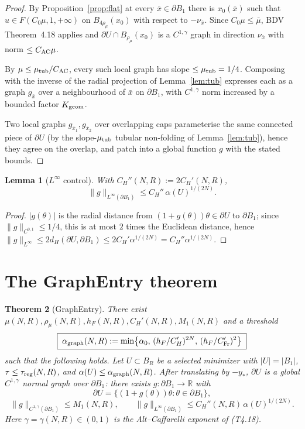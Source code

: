 \documentclass[11pt]{article}
\newtheorem{theorem}{Theorem}[section]
\newtheorem{lemma}[theorem]{Lemma}
\theoremstyle{definition}
\theoremstyle{remark}
\newcommand{\BB}{B_1}
\newcommand{\dH}{d_H}
\newcommand{\R}{\mathbb{R}}
\begin{document}
\begin{proof}
By Proposition~\ref{prop:flat} at every $\bar x\in\partial\BB$ there is
$x_0(\bar x)$ such that $u\in F(C_0\mu,1,+\infty)$ on $B_{4\rho_\mu}(x_0)$
with respect to $-\nu_{\bar x}$. Since $C_0\mu\le\bar\mu$, BDV
Theorem~4.18 applies and $\partial U\cap B_{\rho_\mu}(x_0)$ is a
$C^{1,\gamma}$ graph in direction $\nu_{\bar x}$ with norm
$\le C_{\rm AC}\mu$.

By $\mu\le\mu_{\rm tub}/C_{\rm AC}$, every such local graph has slope
$\le\mu_{\rm tub}=1/4$. Composing with the inverse of the radial
projection of Lemma~\ref{lem:tub} expresses each as a graph
$g_{\bar x}$ over a neighbourhood of $\bar x$ on $\partial\BB$, with
$C^{1,\gamma}$ norm increased by a bounded factor $K_{\rm geom}$.

Two local graphs $g_{\bar x_1},g_{\bar x_2}$ over overlapping caps
parameterise the same connected piece of $\partial U$ (by the
slope-$\mu_{\rm tub}$ tubular non-folding of Lemma~\ref{lem:tub}), hence
they agree on the overlap, and patch into a global function $g$ with the
stated bounds.
\end{proof}

\begin{lemma}[$L^\infty$ control]\label{lem:Linfty}
With $C_H''(N,R):=2C_H'(N,R)$,
\[
\|g\|_{L^\infty(\partial\BB)}\le C_H''\,\alpha(U)^{1/(2N)}.
\]
\end{lemma}

\begin{proof}
$|g(\theta)|$ is the radial distance from $(1+g(\theta))\theta\in\partial
U$ to $\partial\BB$; since $\|g\|_{C^{0,1}}\le1/4$, this is at most $2$
times the Euclidean distance, hence
$\|g\|_{L^\infty}\le 2\dH(\partial U,\partial\BB)
\le 2C_H'\alpha^{1/(2N)}=C_H''\alpha^{1/(2N)}$.
\end{proof}

\section{The GraphEntry theorem}\label{sec:thresh}

\begin{theorem}[GraphEntry]\label{thm:graphentry}
There exist $\mu(N,R),\rho_\mu(N,R),h_F(N,R),C_H'(N,R),M_1(N,R)$ and a
threshold
\[
\boxed{\;\alpha_{\rm graph}(N,R):=
\min\bigl\{\alpha_0,\,(h_F/C_H')^{2N},\,(h_F/C_{\rm Fr}')^2\bigr\}\;}
\]
such that the following holds. Let $U\subset B_R$ be a selected minimizer
with $|U|=|\BB|$, $\tau\le\tau_{\rm reg}(N,R)$, and
$\alpha(U)\le\alpha_{\rm graph}(N,R)$. After translating by $-y_*$,
$\partial U$ is a global $C^{1,\gamma}$ normal graph over $\partial\BB$:
there exists $g:\partial\BB\to\R$ with
\[
\partial U=\{(1+g(\theta))\theta:\theta\in\partial\BB\},
\]
\[
\|g\|_{C^{1,\gamma}(\partial\BB)}\le M_1(N,R),\qquad
\|g\|_{L^\infty(\partial\BB)}\le C_H''(N,R)\,\alpha(U)^{1/(2N)}.
\]
Here $\gamma=\gamma(N,R)\in(0,1)$ is the Alt--Caffarelli exponent of
(T4.18).
\end{theorem}
\end{document}
